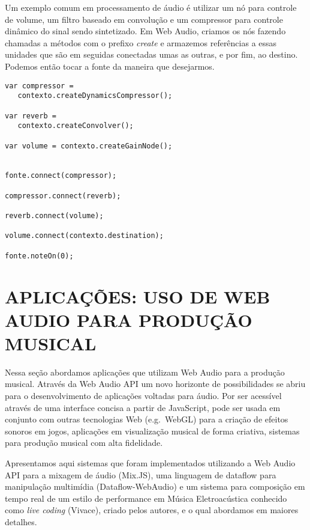 \documentclass
  [ams,pdfout]%
        {aesbr}
\begin{document}
Um exemplo comum em processamento de áudio é utilizar um nó para
controle de volume, um filtro baseado em convolução e um compressor
para controle dinâmico do sinal sendo sintetizado. Em Web Audio,
criamos os nós fazendo chamadas a métodos com o prefixo \emph{create}
e armazemos referências a essas unidades que são em seguidas
conectadas umas as outras, e por fim, ao destino. Podemos então tocar
a fonte da maneira que desejarmos.

\begingroup
    \fontsize{8pt}{9pt}\selectfont
\begin{verbatim}
var compressor = 
   contexto.createDynamicsCompressor();

var reverb = 
   contexto.createConvolver();

var volume = contexto.createGainNode();


fonte.connect(compressor);

compressor.connect(reverb);

reverb.connect(volume);

volume.connect(contexto.destination);

fonte.noteOn(0);
\end{verbatim}
\endgroup


\section{APLICAÇÕES: USO DE WEB AUDIO PARA PRODUÇÃO MUSICAL}

Nessa seção abordamos aplicações que utilizam Web Audio para a
produção musical. Através da Web Audio API um novo horizonte de
possibilidades se abriu para o desenvolvimento de aplicações voltadas
para áudio. Por ser acessível através de uma interface concisa a
partir de JavaScript, pode ser usada em conjunto com outras
tecnologias Web (e.g.\ WebGL) para a criação de efeitos sonoros em
jogos, aplicações em visualização musical de forma criativa, sistemas
para produção musical com alta fidelidade.

Apresentamos aqui sistemas que foram implementados utilizando a Web
Audio API para a mixagem de áudio (Mix.JS), uma linguagem de dataflow
para manipulação multimídia (Dataflow-WebAudio) e um sistema para
composição em tempo real de um estilo de performance em Música
Eletroacústica conhecido como \emph{live coding} (Vivace), criado
pelos autores, e o qual abordamos em maiores detalhes.
\end{document}
